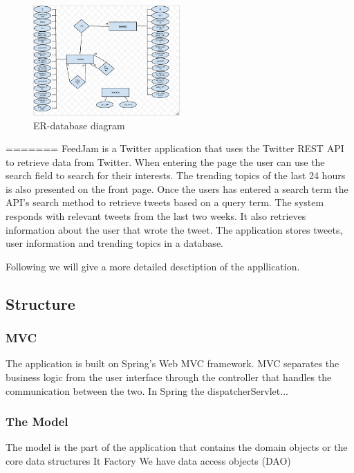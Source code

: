 \begin{figure}[ht]
    \begin{minipage}[b]{1\linewidth}
        \centering
        \includegraphics[width=0.5\textwidth]{figures/erDiagram}
        \caption{ER-database diagram}
        \label{fig:erDiagram}
    \end{minipage}
\end{figure}

=======
FeedJam is a Twitter application that uses the Twitter REST API to retrieve data from Twitter. When entering the page the user can use the search field to search for their interests. The trending topics of the last 24 hours is also presented on the front page. Once the users has entered a search term the API's search method to retrieve tweets based on a query term. 
The system responds with relevant tweets from the last two weeks. It also retrieves information about the user that wrote the tweet. The application stores tweets, user information and trending topics in a database. 

Following we will give a more detailed desctiption of the appllication.

\subsection{Structure}

\subsubsection{MVC} %
The application is built on Spring's Web MVC framework. MVC separates the business logic from the user interface through the controller that handles the communication between the two. In Spring the dispatcherServlet...%


\subsubsection{The Model} %
The model is the part of the application that contains the domain objects or the core data structures \citep{}%
It 
Factory
We have data access objects (DAO) 
